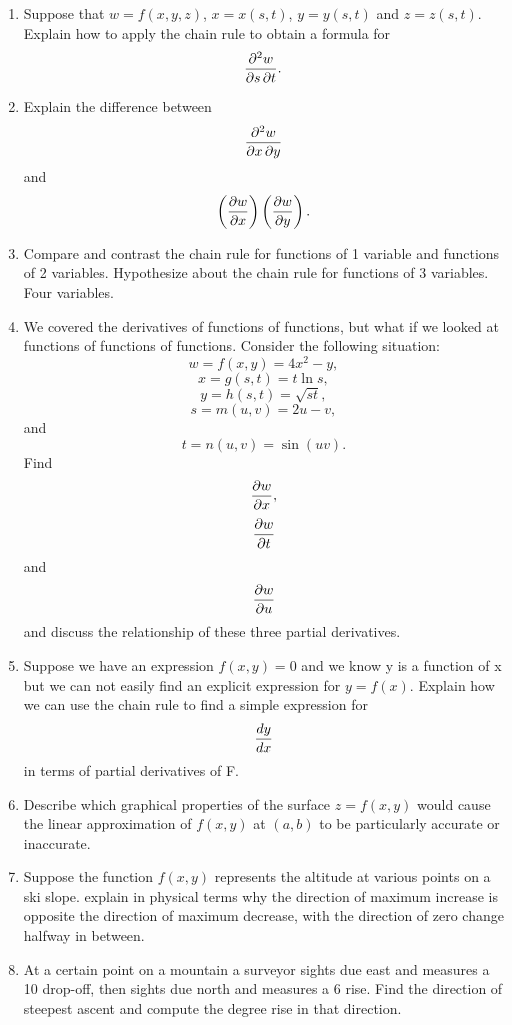 \begin{enumerate}
\item  Suppose that $w = f(x, y, z)$, $x = x(s, t)$, $y = y(s, t)$ and $z = z(s, t)$.  Explain how to apply the chain rule to obtain a formula for $${{\partial ^2 w} \over {\partial s\,\partial t}}.$$

\item  Explain the difference between $${{\partial ^2 w} \over {\partial x\,\partial y}}$$ and $$\left( {{{\partial w} \over {\partial x}}} \right)\left( {{{\partial w} \over {\partial y}}} \right).$$

\item  Compare and contrast the chain rule for functions of 1 variable and functions of 2 variables.  Hypothesize about the chain rule for functions of 3 variables.  Four variables.

\item  We covered the derivatives of functions of functions, but what if we looked at functions of functions of functions.  Consider the following situation:  $$w = f\left( {x,y} \right) = 4x^2  - y,$$ $$x = g\left( {s,t} \right) = t\ln s,$$ $$y = h\left( {s,t} \right) = \sqrt {st} ,$$ $$s = m\left( {u,v} \right) = 2u - v,$$ and $$t = n\left( {u,v} \right) = \sin \left( {uv} \right).$$  Find $${{\partial w} \over {\partial x}},$$ $${{\partial w} \over {\partial t}}$$ and $${{\partial w} \over {\partial u}}$$ and discuss the relationship of these three partial derivatives.

\item  Suppose we have an expression $f(x,y) = 0$ and we know y is a function of x but we can not easily find an explicit expression for $y = f(x)$.  Explain how we can use the chain rule to find a simple expression for $${{dy} \over {dx}}$$ in terms of partial derivatives of F.

\item  Describe which graphical properties of the surface $z = f(x,y)$ would cause the linear approximation of $f(x,y)$ at $(a, b)$ to be particularly accurate or inaccurate.  \cite{SM}

\item  Suppose the function $f(x,y)$ represents the altitude at various points on a ski slope.  explain in physical terms why the direction of maximum increase is   opposite the direction of maximum decrease, with the direction of zero change halfway in between.  \cite{SM}

\item  At a certain point on a mountain a surveyor sights due east and measures a 10  drop-off, then sights due north and measures a 6  rise.  Find the direction of steepest ascent and compute the degree rise in that direction.  \cite{SM}


\end{enumerate}
